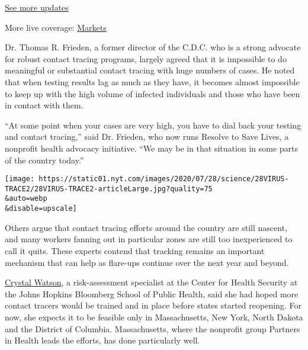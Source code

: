 \href{https://www.nytimes.com/2020/08/03/world/coronavirus-covid-19.html?action=click\&pgtype=Article\&state=default\&region=MAIN_CONTENT_1\&context=storylines_live_updates}{See
more updates}

More live coverage:
\href{https://www.nytimes.com/live/2020/08/03/business/stock-market-today-coronavirus?action=click\&pgtype=Article\&state=default\&region=MAIN_CONTENT_1\&context=storylines_live_updates}{Markets}

Dr. Thomas R. Frieden, a former director of the C.D.C. who is a strong
advocate for robust contact tracing programs, largely agreed that it is
impossible to do meaningful or substantial contact tracing with huge
numbers of cases. He noted that when testing results lag as much as they
have, it becomes almost impossible to keep up with the high volume of
infected individuals and those who have been in contact with them.

``At some point when your cases are very high, you have to dial back
your testing and contact tracing,'' said Dr. Frieden, who now runs
Resolve to Save Lives, a nonprofit health advocacy initiative. ``We may
be in that situation in some parts of the country today.''

\texttt{[image: https://static01.nyt.com/images/2020/07/28/science/28VIRUS-TRACE2/28VIRUS-TRACE2-articleLarge.jpg?quality=75\\\&auto=webp\\\&disable=upscale]}

Others argue that contact tracing efforts around the country are still
nascent, and many workers fanning out in particular zones are still too
inexperienced to call it quits. These experts contend that tracking
remains an important mechanism that can help as flare-ups continue over
the next year and beyond.

\href{https://www.centerforhealthsecurity.org/our-people/C\%20Watson/}{Crystal
Watson}, a risk-assessment specialist at the Center for Health Security
at the Johns Hopkins Bloomberg School of Public Health, said she had
hoped more contact tracers would be trained and in place before states
started reopening. For now, she expects it to be feasible only in
Massachusetts, New York, North Dakota and the District of Columbia.
Massachusetts, where the nonprofit group Partners in Health leads the
efforts, has done particularly well.

